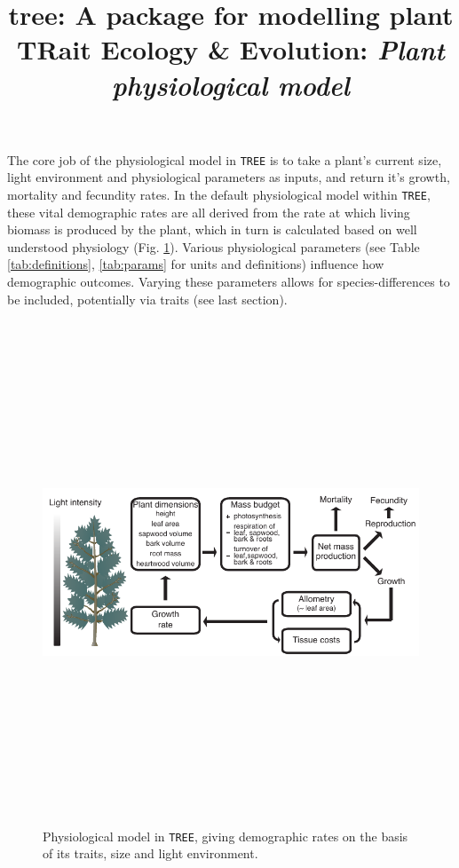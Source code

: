 \documentclass[10pt,twoside]{article}
\title{tree: A package for modelling plant TRait Ecology \& Evolution:
\emph{Plant physiological model}}
\date{}
\begin{document}
\maketitle


The core job of the physiological model in \texttt{TREE} is to take a plant's
current size, light environment and physiological parameters as inputs,
and return it's growth, mortality and fecundity rates. In the default
physiological model within \texttt{TREE}, these vital demographic rates are all
derived from the rate at which living biomass is produced by the plant,
which in turn is calculated based on well understood physiology (Fig.
\ref{fig:schematic-phys}). Various physiological parameters (see Table
\ref{tab:definitions}, \ref{tab:params} for units and definitions)
influence how demographic outcomes. Varying these parameters allows for
species-differences to be included, potentially via traits (see last
section).

\begin{figure}[h!]
\centering
\includegraphics[width=15cm,height=15cm,keepaspectratio]{../output/schematic-phys.pdf}
\caption{Physiological model in \texttt{TREE}, giving 
demographic rates on the basis of its traits, size and light environment.}
\label{fig:schematic-phys}
\end{figure}
\end{document}
